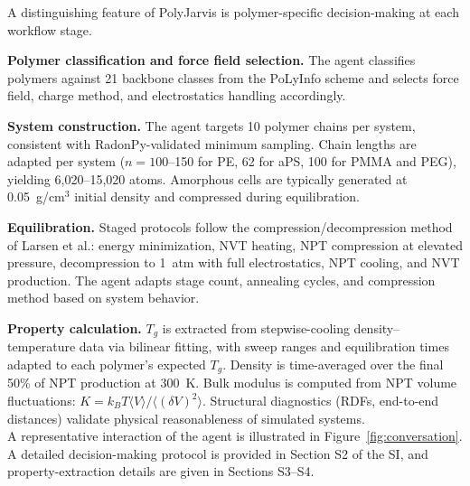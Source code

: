 \documentclass[journal=acsami,manuscript=article]{achemso}
\begin{document}
A distinguishing feature of PolyJarvis is polymer-specific decision-making at each workflow stage.

\textbf{Polymer classification and force field selection.}
The agent classifies polymers against 21 backbone classes from the PoLyInfo scheme\cite{otsuka2011polyinfo} and selects force field, charge method, and electrostatics handling accordingly.

\textbf{System construction.}
The agent targets 10 polymer chains per system, consistent with RadonPy-validated minimum sampling.\cite{hayashi2022radonpy}
Chain lengths are adapted per system ($n = 100$--150 for PE, 62 for aPS, 100 for PMMA and PEG), yielding 6,020--15,020 atoms.
Amorphous cells are typically generated at 0.05~g/cm$^3$ initial density and compressed during equilibration.

\textbf{Equilibration.}
Staged protocols follow the compression/decompression method of Larsen et al.:\cite{larsen2011molecular} energy minimization, NVT heating, NPT compression at elevated pressure, decompression to 1~atm with full electrostatics, NPT cooling, and NVT production.
The agent adapts stage count, annealing cycles, and compression method based on system behavior.

\textbf{Property calculation.}
$T_g$ is extracted from stepwise-cooling density--temperature data via bilinear fitting, with sweep ranges and equilibration times adapted to each polymer's expected $T_g$.
Density is time-averaged over the final 50\% of NPT production at 300~K.
Bulk modulus is computed from NPT volume fluctuations: $K = k_BT\langle V\rangle / \langle(\delta V)^2\rangle$.\cite{allen2017computer}
Structural diagnostics (RDFs, end-to-end distances) validate physical reasonableness of simulated systems.
\\
A representative interaction of the agent is illustrated in Figure~\ref{fig:conversation}. A detailed decision-making protocol is provided in Section S2 of the SI, and property-extraction details are given in Sections S3--S4.
\end{document}
